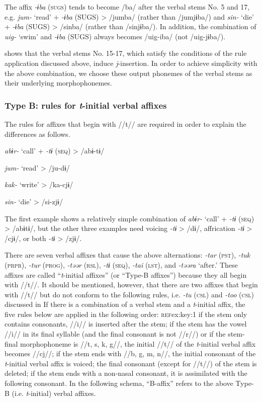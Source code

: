 The affix \textit{-ɨba} (\textsc{sugs}) tends to become /ba/ after the verbal stems No. 5 and 17, e.g. \textit{jum-} ‘read’ + \textit{-ɨba} (SUGS) > /jumba/ (rather than /jumjɨba/) and \textit{sin-} ‘die’ + \textit{-ɨba} (SUGS) > /sinba/ (rather than /sinjɨba/). In addition, the combination of \textit{uig-} ‘swim’ and \textit{-ɨba} (SUGS) always becomes /uig-iba/ (not /uig-jɨba/).

 shows that the verbal stems No. 15-17, which satisfy the conditions of the rule application discussed above, induce \textit{j}-insertion. In order to achieve simplicity with the above combination, we choose these output phonemes of the verbal stems as their underlying morphophonemes.

\subsubsection{Type B: rules for \textit{t}-initial verbal affixes}
\label{bkm:Ref347175824}
The rules for affixes that begin with //t// are required in order to explain the differences as follows.

\ea\label{ex:8-12}
\ea \textit{abɨr-}  ‘call’  +  \textit{-tɨ} (\textsc{seq})  >  /abɨ-tɨ/

\ex \textit{jum-}  ‘read’        >  /ju-dɨ/

\ex \textit{kak-}  ‘write’        >  /ka-cjɨ/

\ex \textit{sin-}  ‘die’        >  /si-zjɨ/
\z
\z

The first example shows a relatively simple combination of \textit{abɨr-} ‘call’ + \textit{-tɨ} (\textsc{seq}) > /abɨtɨ/, but the other three examples need voicing \textit{-tɨ} > /dɨ/, affrication \textit{-tɨ} > /cjɨ/, or both \textit{-tɨ} > /zjɨ/.

There are seven verbal affixes that cause the above alternations: \textit{-tar} (\textsc{pst}), \textit{-tuk} (\textsc{prpr}), \textit{-tur} (\textsc{prog}), \textit{-təər} (\textsc{rsl}), \textit{-tɨ} (\textsc{seq}), \textit{-tai} (\textsc{lst}), and \textit{-təəra} ‘after.’ These affixes are called “\textit{t}-initial affixes” (or “Type-B affixes”) because they all begin with //t//. It should be mentioned, however, that there are two affixes that begin with //t// but do not conform to the following rules, i.e. \textit{-tu} (\textsc{csl}) and \textit{-too} (\textsc{csl}) discussed in  If there is a combination of a verbal stem and a \textit{t}-initial affix, the five rules below are applied in the following order: \textsc{ref}{ex:key:1} if the stem only contains consonants, //i// is inserted after the stem;  if the stem has the vowel //i// in its final syllable (and the final consonant is not //r//) or if the stem-final morphophoneme is //t, s, k, g//, the initial //t// of the \textit{t}-initial verbal affix becomes //cj//;  if the stem ends with //b, g, m, n//, the initial consonant of the \textit{t}-initial verbal affix is voiced;  the final consonant (except for //t//) of the stem is deleted;  if the stem ends with a non-nasal consonant, it is assimilated with the following consonant. In the following schema, “B-affix” refers to the above Type-B (i.e. \textit{t}-initial) verbal affixes.

